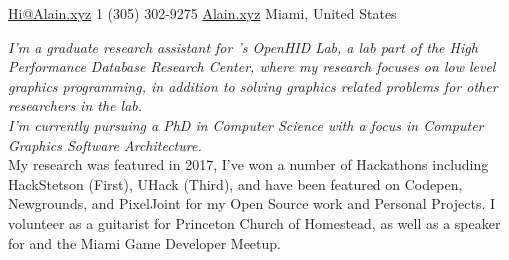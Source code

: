 \documentclass[10pt,a4paper]{article}
\begin{document}
 

\noindent\href{mailto:hi@Alain.xyz}{Hi@Alain.xyz}\bull
\textsmaller{+}1 (305) 302-9275 \bull
\href{https://alain.xyz}{Alain.xyz} \bull Miami, United States

\spacedhrule{0.9em}{-0.4em}



\vspace{-1.3em}

\begin{multicols}{2}
\noindent \textit{I'm a graduate research assistant for 's OpenHID Lab, a  lab part of the High Performance Database Research Center, where my research focuses on low level graphics programming, in addition to solving graphics related problems for other researchers in the lab. \\ I'm currently pursuing a PhD in Computer Science with a focus in Computer Graphics Software Architecture.} \\

My research was featured in  2017, I've won a number of Hackathons including HackStetson (First), UHack (Third), and have been featured on Codepen, Newgrounds, and PixelJoint for my Open Source work and Personal Projects. I volunteer as a guitarist for Princeton Church of Homestead, as well as a speaker for  and the Miami Game Developer Meetup.
\end{multicols}
\end{document}
